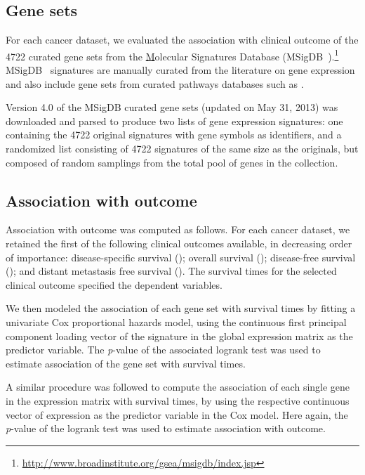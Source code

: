 \subsection{Gene sets}
\label{sec:results-prognostic-survival-genesets}

For each cancer dataset, we evaluated the association with clinical outcome of
the 4722 curated gene sets from the
\href{http://www.broadinstitute.org/gsea/msigdb/index.jsp}Molecular Signatures
Database (\mbox{MSigDB
  }).\footnote{\href{http://www.broadinstitute.org/gsea/msigdb/index.jsp}{http://www.broadinstitute.org/gsea/msigdb/index.jsp}}
\mbox{MSigDB } signatures are manually curated from the literature
on gene expression and also include gene sets from curated pathways databases
such as .

Version 4.0 of the MSigDB curated gene sets (updated on May 31, 2013) was
downloaded and parsed to produce two lists of gene expression signatures: one
containing the 4722 original signatures with gene symbols as identifiers, and a
randomized list consisting of 4722 signatures of the same size as the originals,
but composed of random samplings from the total pool of genes in the collection.

\subsection{Association with outcome}
\label{sec:results-prognostic-survival-association}

Association with outcome was computed as follows.  For each cancer dataset, we
retained the first of the following clinical outcomes available, in decreasing
order of importance: disease-specific survival (); overall
survival (); disease-free survival (); and distant
metastasis free survival ().  The survival times for the
selected clinical outcome specified the dependent variables.

We then modeled the association of each gene set with survival times by fitting
a univariate Cox proportional hazards model, using the continuous first
principal component loading vector of the signature in the global expression
matrix as the predictor variable.  The \emph{p}-value of the associated logrank
test was used to estimate association of the gene set with survival times.

A similar procedure was followed to compute the association of each single gene
in the expression matrix with survival times, by using the respective continuous
vector of expression as the predictor variable in the Cox model.  Here again, the
\emph{p}-value of the logrank test was used to estimate association with
outcome.

